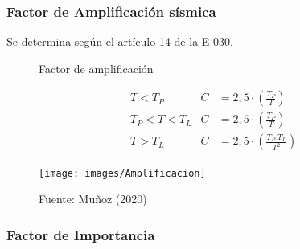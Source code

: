 \documentclass{article}%
\begin{document}
%
\subsubsection{Factor de Amplificación sísmica}%
\label{ssubsec:FactordeAmplificacinssmica}%
Se determina según el artículo 14 de la E{-}030.%
\setlength{\jot}{0.5cm}%


\begin{figure}[h!]%
\caption{Factor de amplificación}%
\begin{minipage}{0.5\textwidth}%

    \begin{align*}
        &T< T_{P}         &   C&=2,5\cdot\left ( \frac{T_{P}}{T} \right )\\
        &T_{P}< T< T_{L}  &   C&=2,5\cdot\left ( \frac{T_{P}}{T} \right )\\
        &T> T_{L}         &   C&=2,5\cdot\left ( \frac{T_{P}\;T_{L}}{T^{2}} \right )
    \end{align*}%
\end{minipage}%
\begin{minipage}{0.4\textwidth}%
\centering%
\texttt{[image: images/Amplificacion]}%
\end{minipage}%
\caption*{Fuente: Muñoz (2020)}%
\end{figure}

%
\subsubsection{Factor de Importancia}%
\label{ssubsec:FactordeImportancia}%
\end{document}
